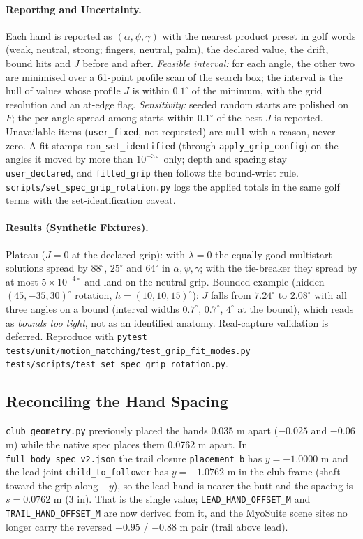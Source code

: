 \documentclass[11pt,a4paper]{article}
\begin{document}
\paragraph{Reporting and Uncertainty.}
Each hand is reported as $(\alpha,\psi,\gamma)$ with the nearest product
preset in golf words (weak, neutral, strong; fingers, neutral, palm), the
declared value, the drift, bound hits and $J$ before and after.
\emph{Feasible interval:} for each angle, the other two are minimised over a
61-point profile scan of the search box; the interval is the hull of values
whose profile $J$ is within $0.1^\circ$ of the minimum, with the grid
resolution and an at-edge flag. \emph{Sensitivity:} seeded random starts are
polished on $F$; the per-angle spread among starts within $0.1^\circ$ of the
best $J$ is reported. Unavailable items (\texttt{user\_fixed}, not requested)
are \texttt{null} with a reason, never zero. A fit stamps
\texttt{rom\_set\_identified} (through \texttt{apply\_grip\_config}) on the
angles it moved by more than $10^{-3\circ}$ only; depth and spacing stay
\texttt{user\_declared}, and \texttt{fitted\_grip} then follows the bound-wrist
rule. \texttt{scripts/set\_spec\_grip\_rotation.py} logs the applied totals in
the same golf terms with the set-identification caveat.

\paragraph{Results (Synthetic Fixtures).}
Plateau ($J=0$ at the declared grip): with $\lambda=0$ the equally-good
multistart solutions spread by $88^\circ$, $25^\circ$ and $64^\circ$ in
$\alpha,\psi,\gamma$; with the tie-breaker they spread by at most
$5\times10^{-4\circ}$ and land on the neutral grip. Bounded example (hidden
$(45,-35,30)^\circ$ rotation, $h=(10,10,15)^\circ$): $J$ falls from
$7.24^\circ$ to $2.08^\circ$ with all three angles on a bound (interval
widths $0.7^\circ$, $0.7^\circ$, $4^\circ$ at the bound), which reads as
\emph{bounds too tight}, not as an identified anatomy. Real-capture
validation is deferred. Reproduce with
\texttt{pytest tests/unit/motion\_matching/test\_grip\_fit\_modes.py
tests/scripts/test\_set\_spec\_grip\_rotation.py}.

\subsection{Reconciling the Hand Spacing}
\texttt{club\_geometry.py} previously placed the hands 0.035 m apart
($-0.025$ and $-0.06$ m) while the native spec places them 0.0762 m apart.
In \texttt{full\_body\_spec\_v2.json} the trail closure \texttt{placement\_b}
has $y=-1.0000$ m and the lead joint \texttt{child\_to\_follower} has
$y=-1.0762$ m in the club frame (shaft toward the grip along $-y$), so the lead
hand is nearer the butt and the spacing is $s=0.0762$ m (3 in). That is the
single value; \texttt{LEAD\_HAND\_OFFSET\_M} and \texttt{TRAIL\_HAND\_OFFSET\_M}
are now derived from it, and the MyoSuite scene sites no longer carry the
reversed $-0.95$ / $-0.88$ m pair (trail above lead).
\end{document}
